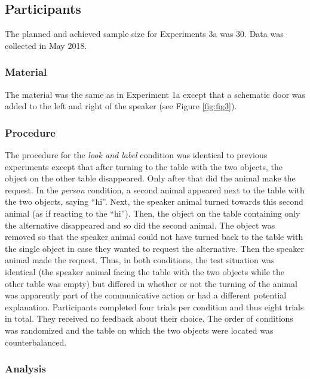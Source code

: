 \documentclass[
  man,floatsintext]{apa6}
\begin{document}
\subsection{Participants}\label{participants-3}

The planned and achieved sample size for Experiments 3a was 30. Data was collected in May 2018.

\subsubsection{Material}\label{material-3}

The material was the same as in Experiment 1a except that a schematic door was added to the left and right of the speaker (see Figure \ref{fig:fig3}).

\subsubsection{Procedure}\label{procedure-3}

The procedure for the \emph{look and label} condition was identical to previous experiments except that after turning to the table with the two objects, the object on the other table disappeared. Only after that did the animal make the request. In the \emph{person} condition, a second animal appeared next to the table with the two objects, saying ``hi''. Next, the speaker animal turned towards this second animal (as if reacting to the ``hi''). Then, the object on the table containing only the alternative disappeared and so did the second animal. The object was removed so that the speaker animal could not have turned back to the table with the single object in case they wanted to request the alternative. Then the speaker animal made the request. Thus, in both conditions, the test situation was identical (the speaker animal facing the table with the two objects while the other table was empty) but differed in whether or not the turning of the animal was apparently part of the communicative action or had a different potential explanation. Participants completed four trials per condition and thus eight trials in total. They received no feedback about their choice. The order of conditions was randomized and the table on which the two objects were located was counterbalanced.

\subsubsection{Analysis}\label{analysis-3}
\end{document}
